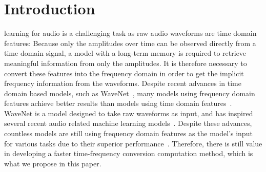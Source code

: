 \documentclass{ieeeaccess}
\begin{document}
\maketitle

\section{Introduction}
\label{sec:Introduction}
 learning for audio is a challenging task as raw audio waveforms are time domain features: Because only the amplitudes over time can be observed directly from a time domain signal, a model with a long-term memory is required to retrieve meaningful information from only the amplitudes. It is therefore necessary to convert these features into the frequency domain in order to get the implicit frequency information from the waveforms. Despite recent advances in time domain based models, such as WaveNet~\cite{Oord2016WaveNetAG}, many models using frequency domain features achieve better results than models using time domain features~\cite{hertel2016comparing,Pons2017EndtoendLF}. WaveNet is a model designed to take raw waveforms as input, and has inspired several recent audio related machine learning models~\cite{Juvela2019GlotNetARW,Rushe2019AnomalyDI,Yoshimura2019SpeakerdependentWD}. Despite these advances, countless models are still using frequency domain features as the model's input for various tasks due to their superior performance~\cite{choi2019zero, gururani2019attention,doras2019cover, doras2019use, meseguer2019conditioned,gillickestimating,balke2019learning,wigginsguitar,nidadavolu2019investigation,Neumann2019ImprovingSE,alAbdullah2019ArtificialNN,Kelz2019TowardsIP,hantrakulfast,taenzerinvestigating,park2019bi,kim2019adversarial,leeautomatic,fuhierarchical,wang2019adaptive}. Therefore, there is still value in developing a faster time-frequency conversion computation method, which is what we propose in this paper. 
\end{document}

